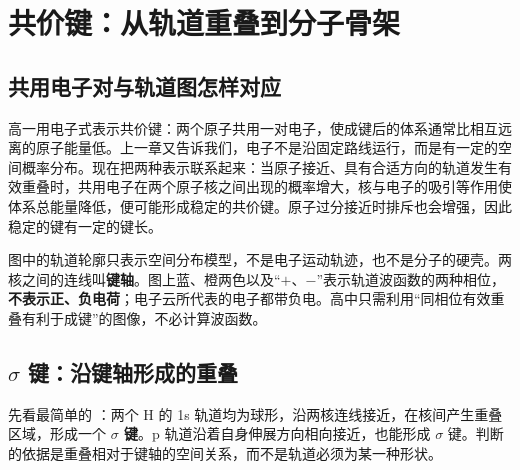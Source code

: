 \documentclass[UTF8,a4paper,zihao=5,oneside,openany,fontset=none]{ctexbook}
\def\sigma{σ}\def\pi{π}\def\Delta{Δ}\def\alpha{α}\def\beta{β}%
\begin{document}
\section{共价键：从轨道重叠到分子骨架}

\subsection{共用电子对与轨道图怎样对应}
高一用电子式表示共价键：两个原子共用一对电子，使成键后的体系通常比相互远离的原子能量低。上一章又告诉我们，电子不是沿固定路线运行，而是有一定的空间概率分布。现在把两种表示联系起来：当原子接近、具有合适方向的轨道发生有效重叠时，共用电子在两个原子核之间出现的概率增大，核与电子的吸引等作用使体系总能量降低，便可能形成稳定的共价键。原子过分接近时排斥也会增强，因此稳定的键有一定的键长。

图中的轨道轮廓只表示空间分布模型，不是电子运动轨迹，也不是分子的硬壳。两核之间的连线叫\textbf{键轴}。图上蓝、橙两色以及“$+$、$-$”表示轨道波函数的两种相位，\textbf{不表示正、负电荷}；电子云所代表的电子都带负电。高中只需利用“同相位有效重叠有利于成键”的图像，不必计算波函数。

\subsection{$\sigma$ 键：沿键轴形成的重叠}
先看最简单的 ：两个 H 的 1s 轨道均为球形，沿两核连线接近，在核间产生重叠区域，形成一个 \textbf{$\sigma$ 键}。p 轨道沿着自身伸展方向相向接近，也能形成 $\sigma$ 键。判断的依据是重叠相对于键轴的空间关系，而不是轨道必须为某一种形状。
\end{document}
